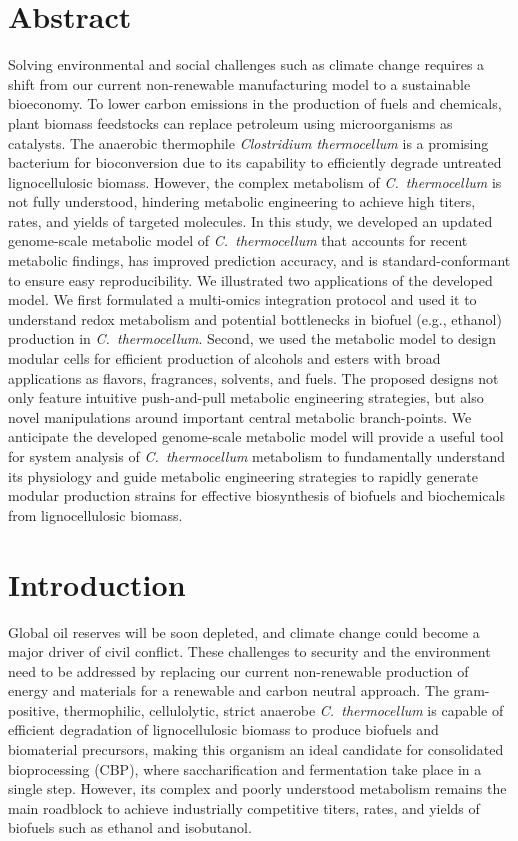 \section*{Abstract}
    Solving environmental and social challenges such as climate change requires a shift from our current non-renewable manufacturing model to a sustainable bioeconomy.
    To lower carbon emissions in the production of fuels and chemicals, plant biomass feedstocks can replace petroleum using microorganisms as catalysts.
    The anaerobic thermophile \textit{Clostridium thermocellum} is a promising bacterium for bioconversion due to its capability to efficiently degrade untreated lignocellulosic biomass.
    However, the complex metabolism of \textit{C.~thermocellum} is not fully understood, hindering metabolic engineering to achieve high titers, rates, and yields of targeted molecules.
    In this study, we developed an updated genome-scale metabolic model of \textit{C.~thermocellum} that accounts for recent metabolic findings, has improved prediction accuracy, and is standard-conformant to ensure easy reproducibility. We illustrated two applications of the developed model.
    We first formulated a multi-omics integration protocol and used it to understand redox metabolism and potential bottlenecks in biofuel (e.g., ethanol) production in \textit{C.~thermocellum}.
    Second, we used the metabolic model to design modular cells for efficient production of alcohols and esters with broad applications as flavors, fragrances, solvents, and fuels.
    The proposed designs not only feature intuitive push-and-pull metabolic engineering strategies, but also novel manipulations around important central metabolic branch-points. We anticipate the developed genome-scale metabolic model will provide a useful tool for system analysis of \textit{C.~thermocellum} metabolism to fundamentally understand its physiology and guide metabolic engineering strategies to rapidly generate modular production strains for effective biosynthesis of biofuels and biochemicals from lignocellulosic biomass.


\section{Introduction}

Global oil reserves will be soon depleted,\citep{shafiee2009}
and climate change could become a major driver of civil conflict.\citep{hsiang2011}
These challenges to security and the environment need to be addressed by replacing our current non-renewable production of energy and materials for a renewable and carbon neutral approach.\citep{ragauskas2006}
The gram-positive, thermophilic, cellulolytic, strict anaerobe \textit{C.~thermocellum} is capable of efficient degradation of lignocellulosic biomass to produce biofuels and biomaterial precursors, making this organism an ideal candidate for consolidated bioprocessing (CBP), where saccharification and fermentation take place in a single step.\citep{olson2012} However, its complex and poorly understood metabolism remains the main roadblock to achieve industrially competitive titers, rates, and yields of biofuels such as ethanol\citep{tian2016} and isobutanol.\citep{lin2015}


